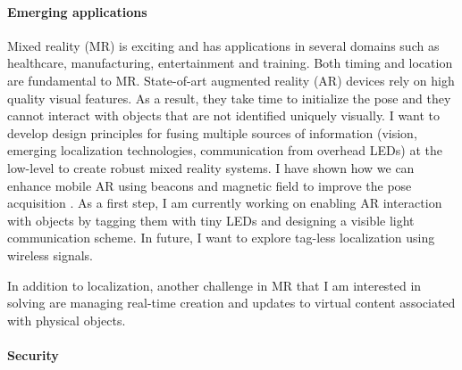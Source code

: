 \documentclass[10pt]{article}
\begin{document}
\paragraph{Emerging applications}

Mixed reality (MR) is exciting and has applications in several domains such as healthcare, manufacturing, entertainment and training.
Both timing and location are fundamental to MR. State-of-art augmented reality (AR) devices rely on high quality visual features. As a result, they take time to initialize the pose and they cannot interact with objects that 
are not identified uniquely visually.  %
I want to develop design principles for fusing multiple sources of information (vision, emerging localization technologies, communication from overhead LEDs) at the low-level to create robust mixed reality systems. %
I have shown how we can enhance mobile AR using beacons and magnetic field to improve the pose acquisition \cite{mobileAR}. As a first step, I am currently working on enabling AR interaction with objects by tagging them with tiny LEDs and designing a visible light communication scheme. In future, I want to explore tag-less localization using wireless signals. 

In addition to localization, another challenge in MR that I am interested in solving are managing real-time creation and updates to virtual content associated with physical
objects. %



\paragraph{Security}
\end{document}
